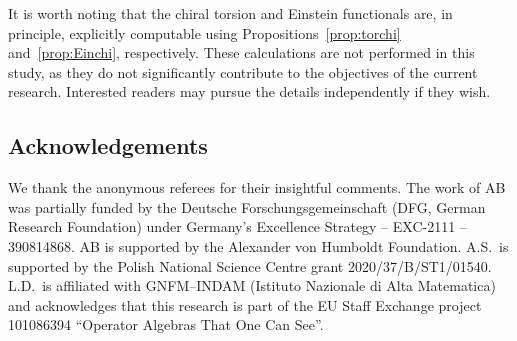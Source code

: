 \documentclass[pdftex]{sigma}
\numberwithin{equation}{section}
\theoremstyle{definition}
\begin{document}
It is worth noting that the chiral torsion and Einstein functionals are, in principle, explicitly computable using Propositions~\ref{prop:torchi} and~\ref{prop:Einchi}, respectively. These calculations are not performed in this study, as they do not significantly contribute to the objectives of the current research. Interested readers may pursue the details independently if they wish.

\subsection*{Acknowledgements}
We thank the anonymous referees for their insightful comments. The work of AB was partially funded by the Deutsche Forschungsgemeinschaft (DFG, German Research Foundation) under Germany's Excellence Strategy -- EXC-2111 -- 390814868. AB is supported by the Alexander von Humboldt Foundation. A.S.\ is supported by the Polish National Science Centre grant 2020/37/B/ST1/01540. L.D.\ is affiliated with GNFM–INDAM (Istituto Nazionale di Alta Matematica) and acknowledges that this research is part of the EU Staff Exchange project 101086394 ``Operator Algebras That One Can See''.
\end{document}
